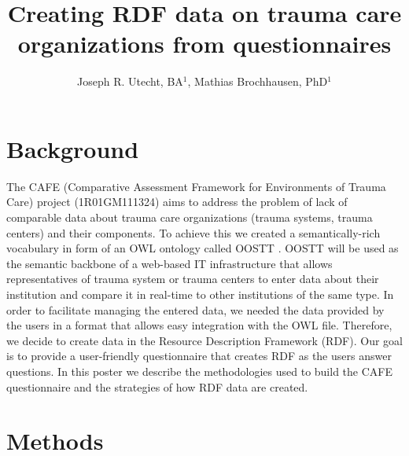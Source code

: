 \documentclass{amia}
\begin{document}
\title{Creating RDF data on trauma care organizations from questionnaires}

\author{Joseph R. Utecht, BA$^{1}$, Mathias Brochhausen, PhD$^{1}$}


\maketitle

\section*{Background}

The CAFE (Comparative Assessment Framework for Environments of Trauma Care) project (1R01GM111324) aims to address the problem of lack of comparable data about trauma care organizations (trauma systems, trauma centers) and their components.
To achieve this we created a semantically-rich vocabulary in form of an OWL ontology called OOSTT \cite{ref1}.
OOSTT will be used as the semantic backbone of a web-based IT infrastructure that allows representatives of trauma system or trauma centers to enter data about their institution and compare it in real-time to other institutions of the same type.
In order to facilitate  managing the entered data, we needed the data provided by the users in a format that allows easy integration with the OWL file.
Therefore, we decide to create data in the Resource Description Framework (RDF).
Our goal is to provide a user-friendly questionnaire that creates RDF as the users answer questions.
In this poster we describe the methodologies used to build the CAFE questionnaire and the strategies of how RDF data are created.

\section*{Methods}
\end{document}
